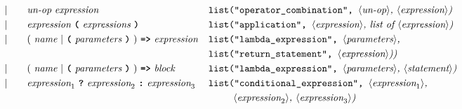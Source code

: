 \begin{alignat*}{9}
&&                       && |   &\quad &&   \textit{un-op} \ 
                                            \textit{expression}
                                                           && \texttt{list("operator\_combination",  } \langle \textit{un-op}\rangle \textit{, } \langle \textit{expression}\rangle \textit{)} \\
&&                       && |   &\quad &&   \textit{expression} \ 
                                            \textbf{\texttt{(}}\ \textit{expressions}\
                                            \textbf{\texttt{)}}
                                                           && \texttt{list("application",  } \langle \textit{expression}\rangle \textit{, list of  } \langle \textit{expression}\rangle \textit{)} \\
&&                       && |   &\quad &&   (\ \textit{name}\ | \
                                               \textbf{\texttt{(}}\ \textit{parameters}\ \textbf{\texttt{)}}\
                                            )\    
                                            \texttt{\textbf{=>}}\ \textit{expression}
                                            && \texttt{list("lambda\_expression",  } \langle \textit{parameters}\rangle \textit{,}  \\
                                              && && & && && \texttt{list("return\_statement",  } \langle \textit{expression}\rangle \textit{))} \\
&&                       && |   &\quad &&   (\ \textit{name}\ | \
                                               \textbf{\texttt{(}}\ \textit{parameters}\ \textbf{\texttt{)}}\
                                            )\    
                                            \texttt{\textbf{=>}}\ \textit{block}
                                                           && \texttt{list("lambda\_expression",  } \langle \textit{parameters}\rangle \textit{,  } \langle \textit{statement}\rangle \textit{)} \\
&&                       && |   &\quad &&   \textit{expression}_1 \ \textbf{\texttt{?}}\ 
                                            \textit{expression}_2
                                            \ \textbf{\texttt{:}}\
                                            \textit{expression}_3\
                                                           && \texttt{list("conditional\_expression",  } \langle \textit{expression}_1\rangle \textit{,} \\
                                            &&&&&&&&&\ \ \ \ \ \ \texttt{ } \langle \textit{expression}_2\rangle \textit{,  } \langle \textit{expression}_3\rangle \textit{)} \\

\end{alignat*}
